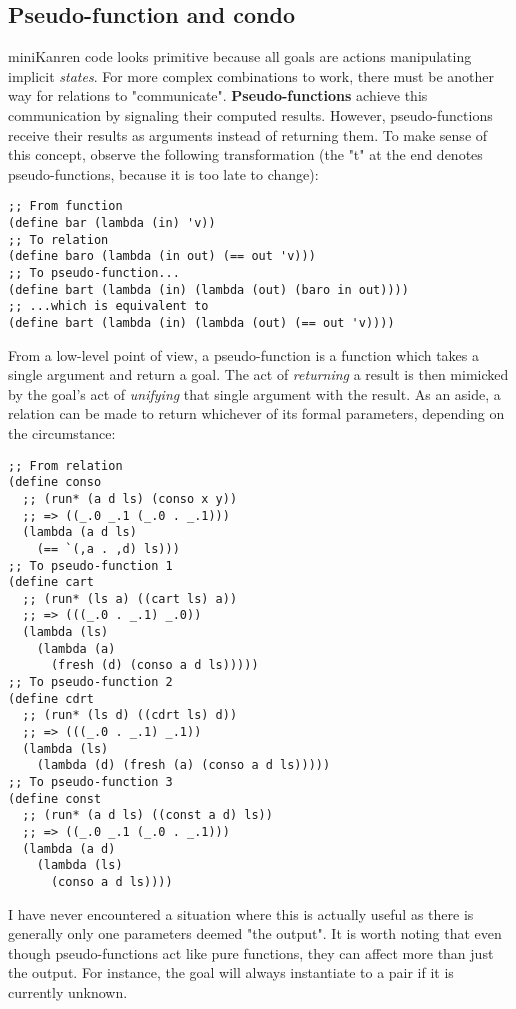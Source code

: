 \subsection{Pseudo-function and condo}
miniKanren code looks primitive because all goals are actions manipulating implicit \textit{states}. For more complex combinations to work, there must be another way for relations to "communicate". \textbf{Pseudo-functions} achieve this communication by signaling their computed results. However, pseudo-functions receive their results as arguments instead of returning them. To make sense of this concept, observe the following transformation (the "t" at the end denotes pseudo-functions, because it is too late to change):
\begin{lstlisting}
;; From function
(define bar (lambda (in) 'v))
;; To relation
(define baro (lambda (in out) (== out 'v)))
;; To pseudo-function...
(define bart (lambda (in) (lambda (out) (baro in out))))
;; ...which is equivalent to
(define bart (lambda (in) (lambda (out) (== out 'v))))
\end{lstlisting}

From a low-level point of view, a pseudo-function is a function which takes a single argument and return a goal. The act of \textit{returning} a result is then mimicked by the goal's act of \textit{unifying} that single argument with the result. As an aside, a relation can be made to return whichever of its formal parameters, depending on the circumstance:
\begin{lstlisting}
;; From relation
(define conso
  ;; (run* (a d ls) (conso x y))
  ;; => ((_.0 _.1 (_.0 . _.1)))
  (lambda (a d ls)
    (== `(,a . ,d) ls)))
;; To pseudo-function 1
(define cart
  ;; (run* (ls a) ((cart ls) a))
  ;; => (((_.0 . _.1) _.0))
  (lambda (ls)
    (lambda (a)
      (fresh (d) (conso a d ls)))))
;; To pseudo-function 2
(define cdrt
  ;; (run* (ls d) ((cdrt ls) d))
  ;; => (((_.0 . _.1) _.1))
  (lambda (ls)
    (lambda (d) (fresh (a) (conso a d ls)))))
;; To pseudo-function 3
(define const
  ;; (run* (a d ls) ((const a d) ls))
  ;; => ((_.0 _.1 (_.0 . _.1)))
  (lambda (a d)
    (lambda (ls)
      (conso a d ls))))
\end{lstlisting}
I have never encountered a situation where this is actually useful as there is generally only one parameters deemed "the output". It is worth noting that even though pseudo-functions act like pure functions, they can affect more than just the output. For instance, the goal  will always instantiate  to a pair if it is currently unknown.


